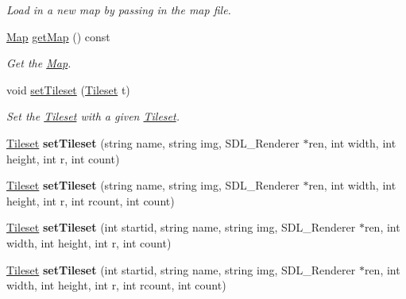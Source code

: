 \begin{DoxyCompactItemize}
\begin{DoxyCompactList}\small\item\em Load in a new map by passing in the map file. \end{DoxyCompactList}\item 
\hyperlink{classMap}{Map} \hyperlink{classStage_a5f18e19add54b6919e9d316e4c0cdaf1}{get\+Map} () const \hypertarget{classStage_a5f18e19add54b6919e9d316e4c0cdaf1}{}\label{classStage_a5f18e19add54b6919e9d316e4c0cdaf1}

\begin{DoxyCompactList}\small\item\em Get the \hyperlink{classMap}{Map}. \end{DoxyCompactList}\item 
void \hyperlink{classStage_a63a19b471f7c54d68f3f7e4419eca8ac}{set\+Tileset} (\hyperlink{classTileset}{Tileset} t)\hypertarget{classStage_a63a19b471f7c54d68f3f7e4419eca8ac}{}\label{classStage_a63a19b471f7c54d68f3f7e4419eca8ac}

\begin{DoxyCompactList}\small\item\em Set the \hyperlink{classTileset}{Tileset} with a given \hyperlink{classTileset}{Tileset}. \end{DoxyCompactList}\item 
\hyperlink{classTileset}{Tileset} {\bfseries set\+Tileset} (string name, string img, S\+D\+L\+\_\+\+Renderer $\ast$ren, int width, int height, int r, int count)\hypertarget{classStage_ab62ad01c46da0337c294c4790020306f}{}\label{classStage_ab62ad01c46da0337c294c4790020306f}

\item 
\hyperlink{classTileset}{Tileset} {\bfseries set\+Tileset} (string name, string img, S\+D\+L\+\_\+\+Renderer $\ast$ren, int width, int height, int r, int rcount, int count)\hypertarget{classStage_a6e71c30197676d98a4a5694ad8b5a733}{}\label{classStage_a6e71c30197676d98a4a5694ad8b5a733}

\item 
\hyperlink{classTileset}{Tileset} {\bfseries set\+Tileset} (int startid, string name, string img, S\+D\+L\+\_\+\+Renderer $\ast$ren, int width, int height, int r, int count)\hypertarget{classStage_ab90d4d0315e6991f2ed8216b6c804339}{}\label{classStage_ab90d4d0315e6991f2ed8216b6c804339}

\item 
\hyperlink{classTileset}{Tileset} {\bfseries set\+Tileset} (int startid, string name, string img, S\+D\+L\+\_\+\+Renderer $\ast$ren, int width, int height, int r, int rcount, int count)\hypertarget{classStage_a42ee2fbdb79971f90984f603fcad54d6}{}\label{classStage_a42ee2fbdb79971f90984f603fcad54d6}


\end{DoxyCompactItemize}
